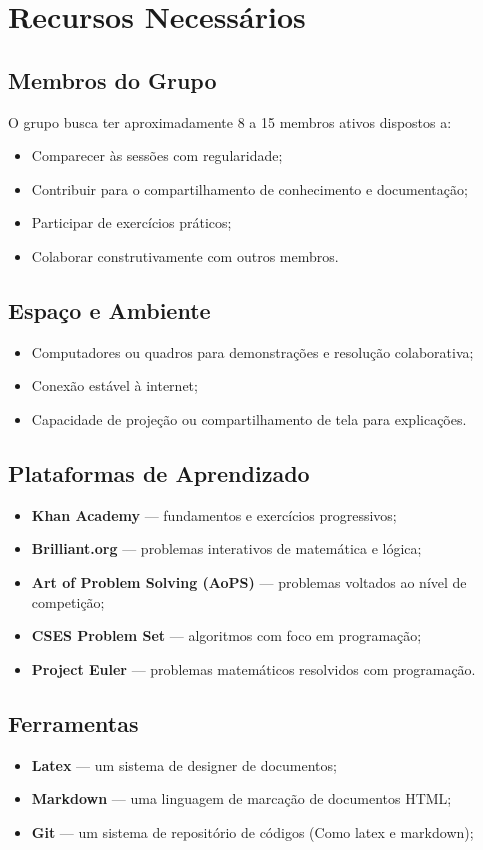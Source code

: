 \clearpage

\section{Recursos Necessários}

\subsection{Membros do Grupo}

O grupo busca ter aproximadamente 8 a 15 membros ativos dispostos a:

\begin{itemize}
  \item Comparecer às sessões com regularidade;
  \item Contribuir para o compartilhamento de conhecimento e documentação;
  \item Participar de exercícios práticos;
  \item Colaborar construtivamente com outros membros.
\end{itemize}

\subsection{Espaço e Ambiente}

\begin{itemize}
  \item Computadores ou quadros para demonstrações e resolução colaborativa;
  \item Conexão estável à internet;
  \item Capacidade de projeção ou compartilhamento de tela para explicações.
\end{itemize}

\subsection{Plataformas de Aprendizado}

\begin{itemize}
  \item \textbf{Khan Academy} --- fundamentos e exercícios progressivos;
  \item \textbf{Brilliant.org} --- problemas interativos de matemática e lógica;
  \item \textbf{Art of Problem Solving (AoPS)} --- problemas voltados ao nível de competição;
  \item \textbf{CSES Problem Set} --- algoritmos com foco em programação;
  \item \textbf{Project Euler} --- problemas matemáticos resolvidos com programação.
\end{itemize}

\subsection{Ferramentas}

\begin{itemize}
  \item \textbf{Latex} --- um sistema de designer de documentos;
  \item \textbf{Markdown} --- uma linguagem de marcação de documentos HTML;
  \item \textbf{Git} --- um sistema de repositório de códigos (Como latex e markdown);
\end{itemize}
